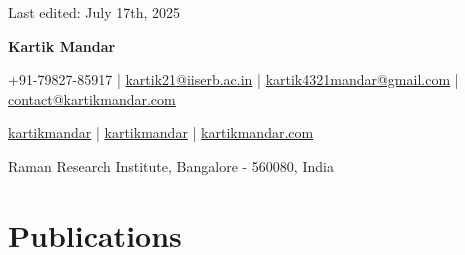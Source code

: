 \documentclass[a4paper,11pt]{article}
\newcommand{\socialicon}[1]{\raisebox{-0.05em}{\resizebox{!}{1em}{#1}}}
\newcommand{\headerfontiii}{\fontfamily{ppl}\selectfont} %
\begin{document}
\headerfontiii


\begin{flushright}
    \small Last edited: July 17th, 2025
\end{flushright}
\begin{center}
    {\Huge\textbf{Kartik Mandar}}
\end{center}


\vspace{-4mm}

\begin{center}
    \small{
    +91-79827-85917 | \href{mailto:kartik21@iiserb.ac.in}{kartik21@iiserb.ac.in} | \href{mailto:kartik4321mandar@gmail.com}{kartik4321mandar@gmail.com} |   \href{mailto:contact@kartikmandar.com}{contact@kartikmandar.com}
    }
\end{center}
\vspace{-6mm}

\begin{center}
    \small{
        \socialicon{\faGithub} \href{https://github.com/kartikmandar}{kartikmandar} |
    \socialicon{\faLinkedin} \href{https://www.linkedin.com/in/kartikmandar/}{kartikmandar} | \socialicon{\faGlobe} \href{https://www.kartikmandar.com/}{kartikmandar.com}

    }
\end{center}
\vspace{-6mm}
\begin{center}
    \small{Raman Research Institute, Bangalore - 560080, India}
\end{center}

\vspace{-4mm}



\section{\textbf{Publications}}
\end{document}
